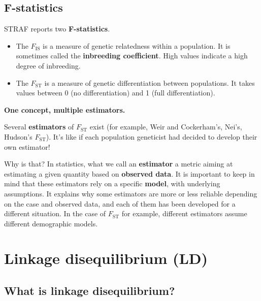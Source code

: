 \documentclass[
]{book}
\begin{document}
\hypertarget{f-statistics}{%
\subsection{F-statistics}\label{f-statistics}}

STRAF reports two \textbf{F-statistics}.

\begin{itemize}
\item
  The \(F_{\textrm{IS}}\) is a measure of genetic relatedness within a population.
  It is sometimes called the \textbf{inbreeding coefficient}. High values indicate
  a high degree of inbreeding.
\item
  The \(F_{\textrm{ST}}\) is a measure of genetic differentiation between populations.
  It takes values between 0 (no differentiation) and 1 (full differentiation).
\end{itemize}

\begin{interpretation}
\textbf{One concept, multiple estimators.}

Several \textbf{estimators} of \(F_{\textrm{ST}}\) exist (for example, Weir and Cockerham's, Nei's,
Hudson's \(F_{\textrm{ST}}\)). It's like if each population geneticist had decided
to develop their own estimator!

Why is that? In statistics, what we call an \textbf{estimator} a metric aiming at estimating
a given quantity based on \textbf{observed data}. It is important to keep in mind that
these estimators rely on a specific \textbf{model}, with underlying assumptions.
It explains why some estimators are more or less reliable depending on the case
and observed data, and each of them has been developed for a different situation.
In the case of \(F_{\textrm{ST}}\) for example, different estimators assume
different demographic models.

\end{interpretation}

\hypertarget{linkage-disequilibrium-ld}{%
\section{Linkage disequilibrium (LD)}\label{linkage-disequilibrium-ld}}

\hypertarget{what-is-linkage-disequilibrium}{%
\subsection{What is linkage disequilibrium?}\label{what-is-linkage-disequilibrium}}
\end{document}
